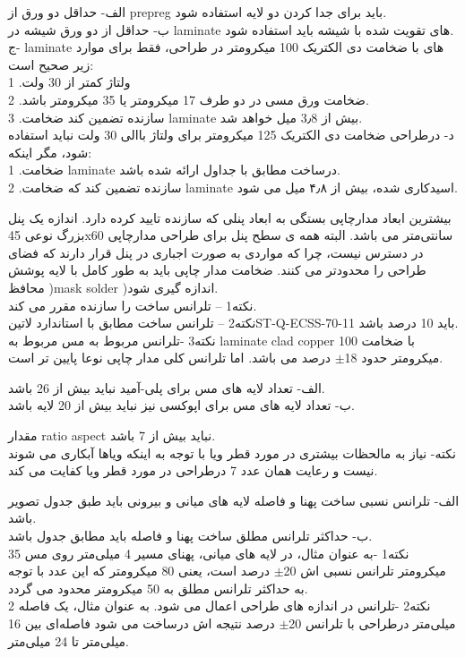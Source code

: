 

الف- حداقل دو ورق از prepreg باید برای جدا کردن دو لایه استفاده شود.\\
ب- حداقل از دو ورق شیشه در laminate های تقویت شده با شیشه باید استفاده شود.\\
ج- laminate های با ضخامت دی الکتریک 100 میکرومتر در طراحی، فقط برای موارد زیر صحیح است:\\
1 .ولتاژ کمتر از 30 ولت\\
2 .ضخامت ورق مسی در دو طرف 17 میکرومتر یا 35 میکرومتر باشد.\\
3 .سازنده تضمین کند ضخامت laminate بیش از 3٫8 میل خواهد شد.\\
د- درطراحی ضخامت دی الکتریک 125 میکرومتر برای ولتاژ باالی 30 ولت نباید استفاده شود، مگر اینکه:\\
1 .ضخامت laminate درساخت مطابق با جداول ارائه شده باشد.\\
2 .سازنده تضمین کند که ضخامت laminate اسیدکاری شده، بیش از ۴٫۸ میل می شود.


بیشترین ابعاد مدارچاپی بستگی به ابعاد پنلی که سازنده تایید کرده دارد. اندازه یک پنل بزرگ
نوعی 45x60 سانتی‌متر می باشد. البته همه ی سطح پنل برای طراحی مدارچاپی در دسترس نیست، چرا
که مواردی به صورت اجباری در پنل قرار دارند که فضای طراحی را محدودتر می کنند.
ضخامت مدار چاپی باید به طور کامل با لایه پوشش محافظ )mask solder )اندازه گیری شود.\\
نکته1 – تلرانس ساخت را سازنده مقرر می کند.\\
نکته2 – تلرانس ساخت مطابق با استاندارد ‌لاتین{ST-Q-ECSS-70-11} باید 10 درصد باشد.\\
نکته3 -تلرانس مربوط به مس مربوط به laminate clad copper با ضخامت 100 میکرومتر حدود
18$\pm$ درصد می باشد. اما تلرانس کلی مدار چاپی نوعا پایین تر است.

الف- تعداد لایه های مس برای پلی-آمید نباید بیش از 26 باشد.\\
ب- تعداد لایه های مس برای اپوکسی نیز نباید بیش از 20 لایه باشد.

مقدار ratio aspect نباید بیش از 7 باشد.\\
نکته- نیاز به مالحظات بیشتری در مورد قطر ویا با توجه به اینکه ویاها آبکاری می شوند
نیست و رعایت همان عدد 7 درطراحی در مورد قطر ویا کفایت می کند.

الف- تلرانس نسبی ساخت پهنا و فاصله لایه های میانی و بیرونی باید طبق جدول تصویر  باشد.\\
ب- حداکثر تلرانس مطلق ساخت پهنا و فاصله باید مطابق جدول  باشد.\\
نکته1 -به عنوان مثال، در لایه های میانی، پهنای مسیر 4 میلی‌متر روی مس 35 میکرومتر تلرانس
نسبی اش 20$\pm$ درصد است، یعنی 80 میکرومتر که این عدد با توجه به حداکثر تلرانس مطلق به 50 میکرومتر محدود
می گردد.\\
نکته2 -تلرانس در اندازه های طراحی اعمال می شود. به عنوان مثال، یک فاصله 2 میلی‌متر
درطراحی با تلرانس 20$\pm$ درصد نتیجه اش درساخت می شود فاصله‌ای بین 16 میلی‌متر تا 24 میلی‌متر.

